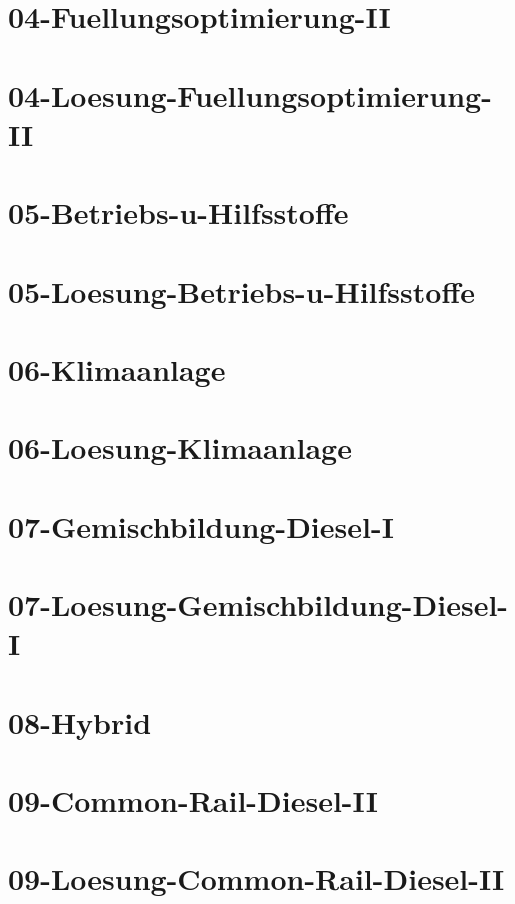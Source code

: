 \chapter{04-Fuellungsoptimierung-II}
%
\chapter{04-Loesung-Fuellungsoptimierung-II}
%
\chapter{05-Betriebs-u-Hilfsstoffe}
%
\chapter{05-Loesung-Betriebs-u-Hilfsstoffe}
%
\chapter{06-Klimaanlage}
%
\chapter{06-Loesung-Klimaanlage}
%
\chapter{07-Gemischbildung-Diesel-I}
%
\chapter{07-Loesung-Gemischbildung-Diesel-I}
%
\chapter{08-Hybrid}
%
\chapter{09-Common-Rail-Diesel-II}
%
\chapter{09-Loesung-Common-Rail-Diesel-II}
%
